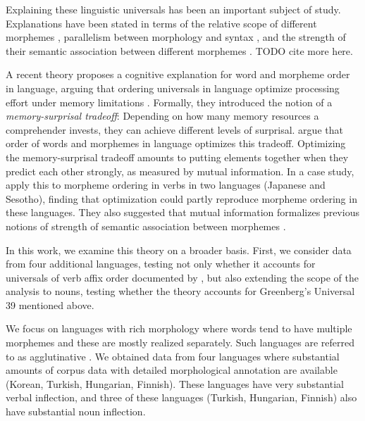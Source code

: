 \documentclass[11pt,letterpaper]{article}
\newcommand{\citep}{\parencite}
\newcommand{\citet}{\Textcite}
\begin{document}
Explaining these linguistic universals has been an important subject of study.
Explanations have been stated in terms of the relative scope of different morphemes  \citep{rice2000morpheme}, parallelism between morphology and syntax \citep{givon1971historical,venneman1973explanation,baker1985the}, and the strength of their semantic association between different morphemes \citep{bybee-morphology-1985}.
TODO cite more here.

A recent theory proposes a cognitive explanation for word and morpheme order in language, arguing that ordering universals in language optimize processing effort under memory limitations \citep{Hahn2020modeling}.
Formally, they introduced the notion of a \emph{memory-surprisal tradeoff}: Depending on how many memory resources a comprehender invests, they can achieve different levels of surprisal.
\citet{Hahn2020modeling} argue that order of words and morphemes in language optimizes this tradeoff.
Optimizing the memory-surprisal tradeoff amounts to putting elements together when they predict each other strongly, as measured by mutual information.
In a case study, \citet{Hahn2020modeling} apply this to morpheme ordering in verbs in two languages (Japanese and Sesotho), finding that optimization could partly reproduce morpheme ordering in these languages.
They also suggested that mutual information formalizes previous notions of strength of semantic association between morphemes \citep{bybee-morphology-1985}. %






In this work, we examine this theory on a broader basis.
First, we consider data from four additional languages, testing not only whether it accounts for universals of verb affix order documented by \cite{bybee-morphology-1985}, but also extending the scope of the analysis to nouns, testing whether the theory accounts for Greenberg's Universal 39 mentioned above.

We focus on languages with rich morphology where words tend to have multiple morphemes and these are mostly realized separately.
Such languages are referred to as agglutinative \citep{humboldt1836uber,greenberg1960a}.
We obtained data from four languages where substantial amounts of corpus data with detailed morphological annotation are available (Korean, Turkish, Hungarian, Finnish).
These languages have very substantial verbal inflection, and three of these languages (Turkish, Hungarian, Finnish) also have substantial noun inflection.
\end{document}
